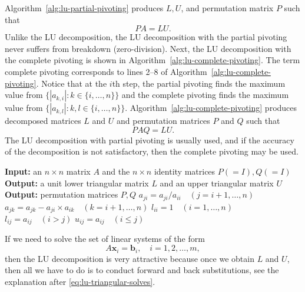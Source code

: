 {Algorithm~\ref{alg:lu-partial-pivoting} produces $L,U$, and permutation matrix $P$ such that}
\[PA=LU.\]
{Unlike the LU decomposition, the LU decomposition with the partial pivoting never suffers from breakdown (zero-division).}
{Next, the LU decomposition with the complete pivoting is shown in Algorithm~\ref{alg:lu-complete-pivoting}. The term complete pivoting corresponds to lines 2--8 of Algorithm~\ref{alg:lu-complete-pivoting}.}
{Notice that at the $i$th step, the partial pivoting finds the maximum value from $\{|a_{k,i}|:k\in\{i,\ldots,n\}\}$ and the complete pivoting finds the maximum value from $\{|a_{k,l}|:k,l\in\{i,\ldots,n\}\}$.}
{Algorithm~\ref{alg:lu-complete-pivoting} produces decomposed matrices $L$ and $U$ and permutation matrices $P$ and $Q$ such that}
\[PAQ=LU.\]
{The LU decomposition with partial pivoting is usually used, and if the accuracy of the decomposition is not satisfactory, then the complete pivoting may be used.}
\begin{algorithm}[H]
\caption{{The LU decomposition with complete pivoting}}\label{alg:lu-complete-pivoting}
\begin{algorithmic}[1]
\Statex \textbf{Input:} {an $n\times n$ matrix $A$ and the $n\times n$ identity matrices $P(=I),Q(=I)$}
\Statex \textbf{Output:} {a unit lower triangular matrix $L$ and an upper triangular matrix $U$}
\Statex \textbf{Output:} {permutation matrices $P,Q$}
\EndIf
\State $a_{ji}=a_{ji}/a_{ii}\quad(j=i+1,\ldots,n)$
\State $a_{jk}=a_{jk}-a_{ji}\times a_{ik}\quad(k=i+1,\ldots,n)$
\EndFor
\EndFor
\State $l_{ii}=1\quad(i=1,\ldots,n)$
\State $l_{ij}=a_{ij}\quad(i>j)$
\State $u_{ij}=a_{ij}\quad(i\le j)$
\end{algorithmic}
\end{algorithm}
{If we need to solve the set of linear systems of the form}
\[A\bm x_i=\bm b_i,\quad i=1,2,\ldots,m,\]
{then the LU decomposition is very attractive because once we obtain $L$ and $U$, then all we have to do is to conduct forward and back substitutions, see the explanation after \eqref{eq:lu-triangular-solves}.}
